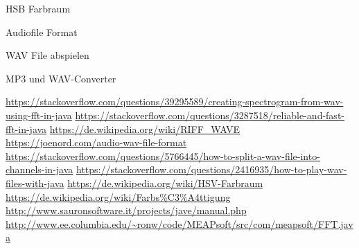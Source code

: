 \documentclass[12pt,a4paper]{article}
\begin{document}
HSB Farbraum\cite{hsb}

Audiofile Format\cite{audioformat}

WAV File abspielen\cite{wavwiedergabe}

MP3 und WAV-Converter\cite{sauronsoftConverter}

\begin{thebibliography}{\hspace{3cm}}
 \url{https://stackoverflow.com/questions/39295589/creating-spectrogram-from-wav-using-fft-in-java}
 \url{https://stackoverflow.com/questions/3287518/reliable-and-fast-fft-in-java}
 \url{https://de.wikipedia.org/wiki/RIFF\_WAVE}
 \url{https://joenord.com/audio-wav-file-format}
 \url{https://stackoverflow.com/questions/5766445/how-to-split-a-wav-file-into-channels-in-java}
 \url{https://stackoverflow.com/questions/2416935/how-to-play-wav-files-with-java}
 \url{https://de.wikipedia.org/wiki/HSV-Farbraum}
 \url{https://de.wikipedia.org/wiki/Farbs\%C3\%A4ttigung}
 \url{http://www.sauronsoftware.it/projects/jave/manual.php}
 \url{http://www.ee.columbia.edu/~ronw/code/MEAPsoft/src/com/meapsoft/FFT.java}
\end{thebibliography}
\end{document}
